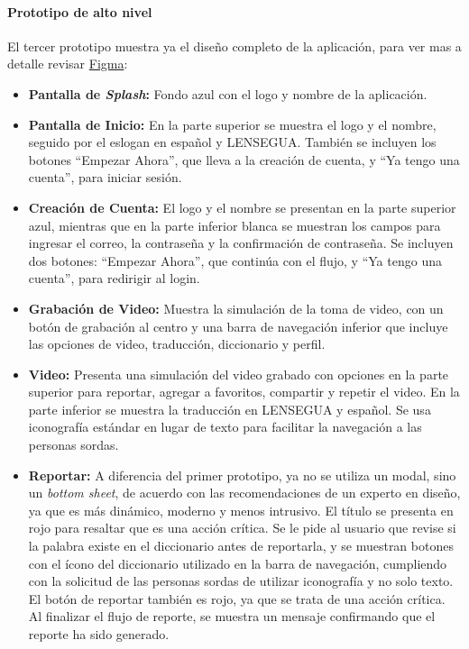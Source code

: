 \paragraph{Prototipo de alto nivel}

El tercer prototipo muestra ya el diseño completo de la aplicación, para ver mas a detalle revisar \href{https://www.figma.com/design/d7NOw36r1mUY7qDBIveJ2K/Se%C3%B1as-Chapinas?node-id=322-1684&node-type=CANVAS&t=ua1wEji5yxVRI6ES-0}{Figma}:

\begin{itemize}
    \item \textbf{Pantalla de \textit{Splash}:} Fondo azul con el logo y nombre de la aplicación.
  
    \item \textbf{Pantalla de Inicio:} En la parte superior se muestra el logo y el nombre, seguido por el eslogan en español y LENSEGUA. También se incluyen los botones ``Empezar Ahora'', que lleva a la creación de cuenta, y ``Ya tengo una cuenta'', para iniciar sesión.
  
    \item \textbf{Creación de Cuenta:} El logo y el nombre se presentan en la parte superior azul, mientras que en la parte inferior blanca se muestran los campos para ingresar el correo, la contraseña y la confirmación de contraseña. Se incluyen dos botones: ``Empezar Ahora'', que continúa con el flujo, y ``Ya tengo una cuenta'', para redirigir al login.
  
    \item \textbf{Grabación de Video:} Muestra la simulación de la toma de video, con un botón de grabación al centro y una barra de navegación inferior que incluye las opciones de video, traducción, diccionario y perfil.

    \item \textbf{Video:} Presenta una simulación del video grabado con opciones en la parte superior para reportar, agregar a favoritos, compartir y repetir el video. En la parte inferior se muestra la traducción en LENSEGUA y español. Se usa iconografía estándar en lugar de texto para facilitar la navegación a las personas sordas.

    \item \textbf{Reportar:} A diferencia del primer prototipo, ya no se utiliza un modal, sino un \textit{bottom sheet}, de acuerdo con las recomendaciones de un experto en diseño, ya que es más dinámico, moderno y menos intrusivo. El título se presenta en rojo para resaltar que es una acción crítica. Se le pide al usuario que revise si la palabra existe en el diccionario antes de reportarla, y se muestran botones con el ícono del diccionario utilizado en la barra de navegación, cumpliendo con la solicitud de las personas sordas de utilizar iconografía y no solo texto. El botón de reportar también es rojo, ya que se trata de una acción crítica. Al finalizar el flujo de reporte, se muestra un mensaje confirmando que el reporte ha sido generado.


\end{itemize}
